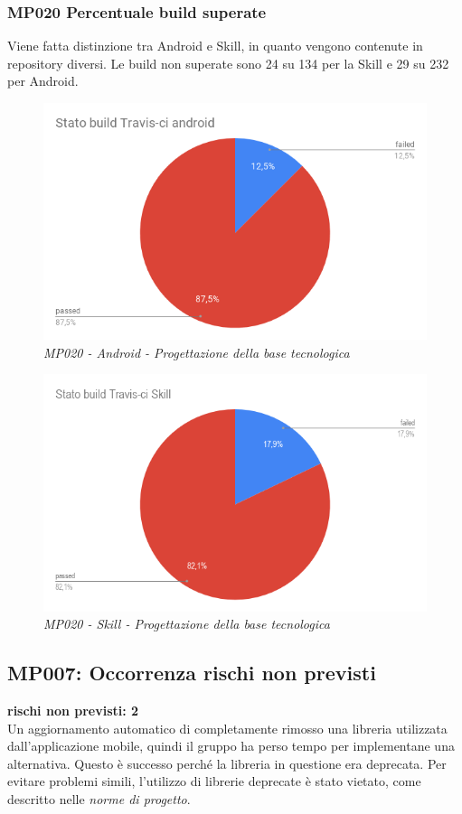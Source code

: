 \subsubsection{MP020 Percentuale build superate}
Viene fatta distinzione tra Android e Skill, in quanto vengono contenute in repository diversi.
Le build non superate sono 24 su 134 per la Skill e 29 su 232 per Android.
\begin{figure} [h]
    \centering
	\includegraphics[scale=0.5]{./images/StatobuildTravis-ciandroid.png}
    \caption{\textit{MP020 - Android - Progettazione della base tecnologica}}\label{}
\end{figure}
\begin{figure} [h]
    \centering
	\includegraphics[scale=0.5]{./images/StatobuildTravis-ciSkill.png}
    \caption{\textit{MP020 - Skill - Progettazione della base tecnologica}}\label{}
\end{figure}

\subsection{MP007:  Occorrenza rischi non previsti}
\textbf{rischi non previsti: 2}\\
Un aggiornamento automatico di  completamente rimosso una libreria utilizzata dall'applicazione mobile, quindi il gruppo ha perso tempo per implementane una alternativa. Questo è successo perché la libreria in questione era deprecata. Per evitare problemi simili, l'utilizzo di librerie deprecate è stato vietato, come descritto nelle \textit{norme di progetto}.\\
